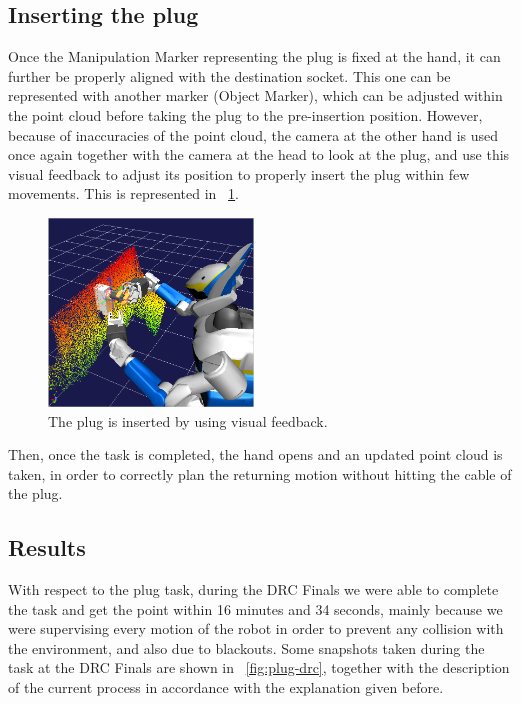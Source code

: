 	\subsection{Inserting the plug}
		
		Once the Manipulation Marker representing the plug is fixed at the hand, it can further be properly
		aligned with the destination socket.
		This one can be represented with another marker (Object Marker), which can be adjusted within the
		point cloud before taking the plug to the pre-insertion position.
		However, because of inaccuracies of the point cloud, the camera at the other hand is used once again
		together with the camera at the head to look at the plug, and use this visual feedback to adjust its
		position to properly insert the plug within few movements.
		This is represented in \figurename~\ref{fig:InsertPlug}.
		
		\begin{figure}[b]
			\centering
			\includegraphics[height = 5cm]{img/InsertPlug}
			\caption{The plug is inserted by using visual feedback.}
			\label{fig:InsertPlug}
		\end{figure}
		
		Then, once the task is completed, the hand opens and an updated point cloud is taken, in order to
		correctly plan the returning motion without hitting the cable of the plug.
		
	\subsection{Results}
		
		With respect to the plug task, during the DRC Finals we were able to complete the task
		and get the point	within 16 minutes and 34 seconds, mainly because we were supervising
		every motion of the robot in order to prevent any collision with the environment, and
		also due to blackouts.
		Some snapshots taken during the task at the DRC Finals are shown in
		\figurename~\ref{fig:plug-drc}, together with the description of the current process
		in accordance with the explanation given before.
		
